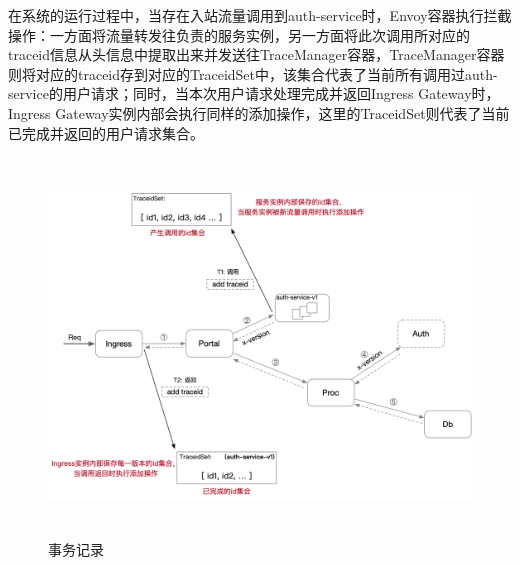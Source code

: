 \documentclass[12pt,a4paper]{article}
\begin{document}
\begin{enumerate}
	在系统的运行过程中，当存在入站流量调用到auth-service时，Envoy容器执行拦截操作：一方面将流量转发往负责的服务实例，另一方面将此次调用所对应的traceid信息从头信息中提取出来并发送往TraceManager容器，TraceManager容器则将对应的traceid存到对应的TraceidSet中，该集合代表了当前所有调用过auth-service的用户请求；同时，当本次用户请求处理完成并返回Ingress Gateway时，Ingress Gateway实例内部会执行同样的添加操作，这里的TraceidSet则代表了当前已完成并返回的用户请求集合。
	\begin{figure}[ht]
	 \centering
	 \includegraphics[height=10cm]{images/record_trace.png}
	 \caption{事务记录}
	 \label{fig:record_trace}
	\end{figure}


\end{enumerate}
\end{document}
